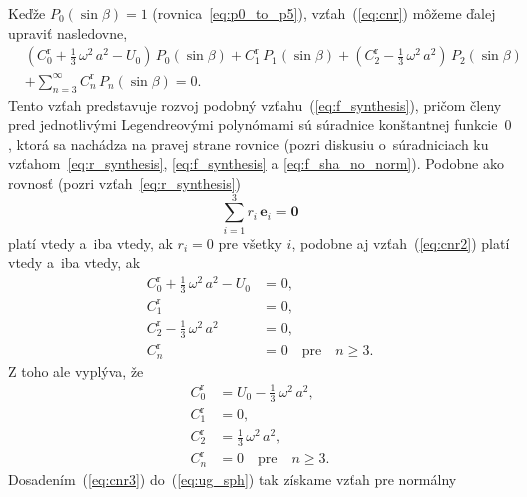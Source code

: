 \documentclass[a4paper, 12pt]{book}
\let\vec\mathbf
\begin{document}
Keďže $P_0(\sin\beta) = 1$ (rovnica~\ref{eq:p0_to_p5}), vzťah~(\ref{eq:cnr}) 
môžeme ďalej upraviť nasledovne,
%
\begin{equation}
\label{eq:cnr2}
\begin{split}
&\left( C_0^\mathrm{r} + \frac{1}{3} \, \omega^2 \, a^2 - U_0 \right) \, 
P_0(\sin\beta) + C_1^\mathrm{r} \, P_1(\sin\beta) + \left(C_2^\mathrm{r} 
- \frac{1}{3} \, \omega^2 \, a^2 \right) \, P_2(\sin\beta)\\
%
&+ \sum_{n = 3}^\infty C^{\mathrm{r}}_n \, P_n(\sin\beta) = 0{.}
\end{split}
\end{equation}
%
Tento vzťah predstavuje rozvoj podobný vzťahu~(\ref{eq:f_synthesis}), pričom 
členy pred jednotlivými Legendreovými polynómami sú súradnice konštantnej 
funkcie~$0$, ktorá sa nachádza na pravej strane rovnice (pozri diskusiu 
o~súradniciach ku vzťahom~\ref{eq:r_synthesis}, \ref{eq:f_synthesis} 
a \ref{eq:f_sha_no_norm}).  Podobne ako rovnosť (pozri 
vzťah~\ref{eq:r_synthesis})
%
\begin{equation}
\sum_{i = 1}^3 r_i \, \vec{e}_i = \vec{0}
\end{equation}
%
platí vtedy a~iba vtedy, ak $r_i = 0$ pre všetky $i$, podobne aj 
vzťah~(\ref{eq:cnr2}) platí vtedy a~iba vtedy, ak
%
\begin{equation}
\begin{split}
C_0^\mathrm{r} + \frac{1}{3} \, \omega^2 \, a^2 - U_0 &= 0{,}\\
C_1^\mathrm{r}                                        &= 0{,}\\
C_2^\mathrm{r} - \frac{1}{3} \, \omega^2 \, a^2       &= 0{,}\\
C_n^\mathrm{r}                                        &= 0 \quad \textrm{pre} 
\quad n \geq 3{.}
\end{split}
\end{equation}
%
Z toho ale vyplýva, že
%
\begin{equation}
\label{eq:cnr3}
\begin{split}
C_0^\mathrm{r} &= U_0 - \frac{1}{3} \, \omega^2 \, a^2{,}\\
C_1^\mathrm{r} &= 0{,}\\
C_2^\mathrm{r} &= \frac{1}{3} \, \omega^2 \, a^2{,}\\
C_n^\mathrm{r} &= 0 \quad \textrm{pre} \quad n \geq 3{.}
\end{split}
\end{equation}
%
Dosadením~(\ref{eq:cnr3}) do~(\ref{eq:ug_sph}) tak získame vzťah pre normálny 
\end{document}
